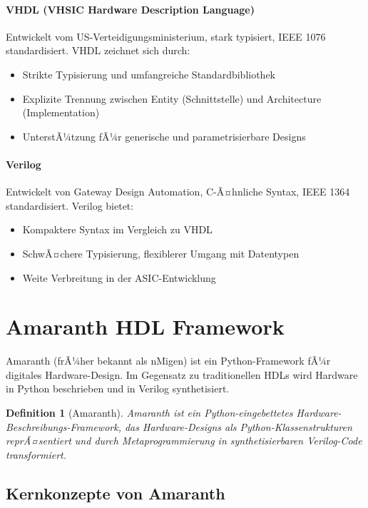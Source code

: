 ﻿\documentclass[12pt,a4paper]{report}
\newtheorem{definition}{Definition}[section]
\begin{document}
\paragraph{VHDL (VHSIC Hardware Description Language)}
Entwickelt vom US-Verteidi\-gungs\-ministerium, stark typisiert, IEEE 1076 standardisiert. VHDL zeichnet sich durch:
\begin{itemize}
    \item Strikte Typisierung und umfangreiche Standardbibliothek
    \item Explizite Trennung zwischen Entity (Schnittstelle) und Architecture (Implementation)
    \item UnterstÃ¼tzung fÃ¼r generische und parametrisierbare Designs
\end{itemize}

\paragraph{Verilog}
Entwickelt von Gateway Design Automation, C-Ã¤hnliche Syntax, IEEE 1364 standardisiert. Verilog bietet:
\begin{itemize}
    \item Kompaktere Syntax im Vergleich zu VHDL
    \item SchwÃ¤chere Typisierung, flexiblerer Umgang mit Datentypen
    \item Weite Verbreitung in der ASIC-Entwicklung
\end{itemize}

\section{Amaranth HDL Framework}

Amaranth (frÃ¼her bekannt als nMigen) ist ein Python-Framework fÃ¼r digitales Hardware-Design. Im Gegensatz zu traditionellen HDLs wird Hardware in Python beschrieben und in Verilog synthetisiert.

\begin{definition}[Amaranth]
Amaranth ist ein Python-eingebettetes Hardware-Beschrei\-bungs-Framework, das Hardware-Designs als Python-Klassenstrukturen reprÃ¤sentiert und durch Metaprogrammierung in synthetisierbaren Verilog-Code transformiert.
\end{definition}

\subsection{Kernkonzepte von Amaranth}
\end{document}
